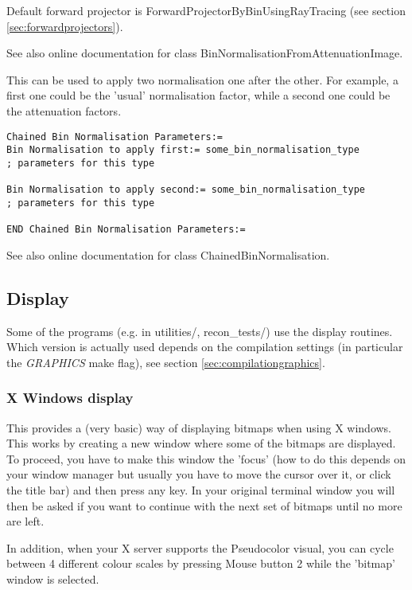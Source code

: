 \documentclass{article}
\begin{document}
Default forward projector is ForwardProjectorByBinUsingRayTracing 
(see section \ref{sec:forwardprojectors}).


See also online documentation for class BinNormalisationFromAttenuationImage.

{ 
}
\label{sec:chainedbinnormalisation}
This can be used to apply two normalisation one after the other. 
For example, a first one could be the 'usual' normalisation factor, 
while a second one could be the attenuation factors.

{ 
}
\begin{verbatim}
Chained Bin Normalisation Parameters:=
Bin Normalisation to apply first:= some_bin_normalisation_type
; parameters for this type

Bin Normalisation to apply second:= some_bin_normalisation_type
; parameters for this type

END Chained Bin Normalisation Parameters:=
\end{verbatim}

See also online documentation for class ChainedBinNormalisation.



\subsection{
Display}

Some of the programs (e.g. in utilities/, recon\_tests/) use 
the display routines. Which version is actually used depends 
on the compilation settings (in particular the \textit{GRAPHICS} make 
flag), see section \ref{sec:compilationgraphics}. 


\subsubsection{
X Windows display}
\label{sec:display}
This provides a (very basic) way of displaying bitmaps when using 
X windows. This works by creating a new window where some of 
the bitmaps are displayed. To proceed, you have to make this 
window the 'focus' (how to do this depends on your window manager 
but usually you have to move the cursor over it, or click the 
title bar) and then press any key. In your original terminal 
window you will then be asked if you want to continue with the 
next set of bitmaps until no more are left.


In addition, when your X server supports the Pseudocolor visual, 
you can cycle between 4 different colour scales by pressing Mouse 
button 2 while the 'bitmap' window is selected.
\end{document}

